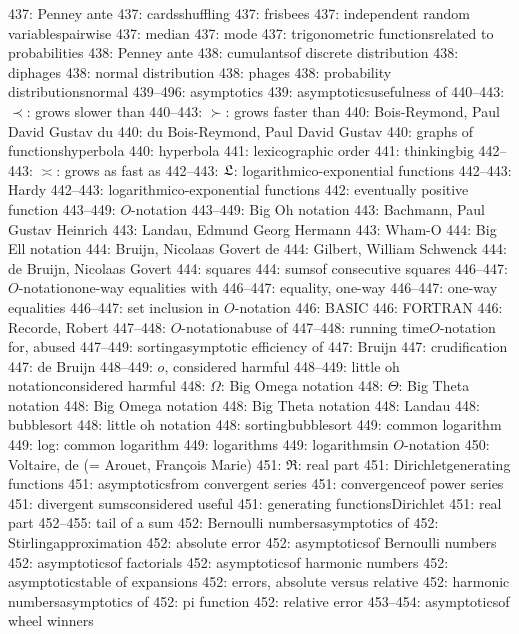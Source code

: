 437: Penney ante
437: cards\sub shuffling
437: frisbees
437: independent random variables\sub pairwise
437: median
437: mode
437: trigonometric functions\sub related to probabilities
438: Penney ante
438: cumulants\sub of discrete distribution
438: diphages
438: normal distribution
438: phages
438: probability distributions\sub normal
439--496: asymptotics
439: asymptotics\sub usefulness of
440--443: $\prec$: grows slower than
440--443: $\succ$: grows faster than
440: Bois-Reymond, Paul David Gustav du
440: du Bois-Reymond, Paul David Gustav
440: graphs of functions\sub hyperbola
440: hyperbola
441: lexicographic order
441: thinking\sub big
442--443: $\asymp$: grows as fast as
442--443: $\frak L$: logarithmico-exponential functions
442--443: Hardy
442--443: logarithmico-exponential functions
442: eventually positive function
443--449: $O$-notation
443--449: Big Oh notation
443: Bachmann, Paul Gustav Heinrich
443: Landau, Edmund Georg Hermann
443: Wham-O
444: Big Ell notation
444: Bruijn, Nicolaas Govert de
444: Gilbert, William Schwenck
444: de Bruijn, Nicolaas Govert
444: squares
444: sums\sub of consecutive squares
446--447: $O$-notation\sub one-way equalities with
446--447: equality, one-way
446--447: one-way equalities
446--447: set inclusion in $O$-notation
446: BASIC
446: FORTRAN
446: Recorde, Robert
447--448: $O$-notation\sub abuse of
447--448: running time\sub $O$-notation for, abused
447--449: sorting\sub asymptotic efficiency of
447: Bruijn
447: crudification
447: de Bruijn
448--449: $o$, considered harmful
448--449: little oh notation\sub considered harmful
448: $\Omega$: Big Omega notation
448: $\Theta$: Big Theta notation
448: Big Omega notation
448: Big Theta notation
448: Landau
448: bubblesort
448: little oh notation
448: sorting\sub bubblesort
449: common logarithm
449: log: common logarithm
449: logarithms
449: logarithms\sub in $O$-notation
450: Voltaire, de (= Arouet, Fran\c{c}ois Marie)
451: $\Re$: real part
451: Dirichlet\sub generating functions
451: asymptotics\sub from convergent series
451: convergence\sub of power series
451: divergent sums\sub considered useful
451: generating functions\sub Dirichlet
451: real part
452--455: tail of a sum
452: Bernoulli numbers\sub asymptotics of
452: Stirling\sub approximation
452: absolute error
452: asymptotics\sub of Bernoulli numbers
452: asymptotics\sub of factorials
452: asymptotics\sub of harmonic numbers
452: asymptotics\sub table of expansions
452: errors, absolute versus relative
452: harmonic numbers\sub asymptotics of
452: pi function
452: relative error
453--454: asymptotics\sub of wheel winners
